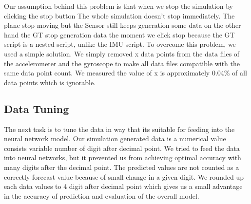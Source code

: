 Our assumption behind this problem is that when we stop the simulation by clicking the stop button The whole simulation doesn’t stop immediately. The plane stop moving but the Sensor still keeps generation some data on the other hand the GT stop generation data the moment we click stop because the GT script is a nested script, unlike the IMU script.
To overcome this problem, we used a simple solution.  We simply removed x data points from the data files of the accelerometer and the gyroscope to make all data files compatible with the same data point count. We measured the value of x is approximately 0.04\% of all data points which is ignorable.


\subsection{Data Tuning}

The next task is to tune the data in way that its suitable for feeding into the neural network model. Our simulation generated data is a numerical value consists variable number of digit after decimal point. We tried to feed the data into neural networks, but it prevented us from achieving optimal accuracy with many digits after the decimal point. The predicted values are not counted as a correctly forecast value because of small change in a given digit. We rounded up each data values to 4 digit after decimal point which gives us a small advantage in the accuracy of prediction and evaluation of the overall model.

\begin{table}[h]
\centering
{}
\caption{Sample ground truth data before rounding up}
\label{tab: gtBR}
\end{table}

